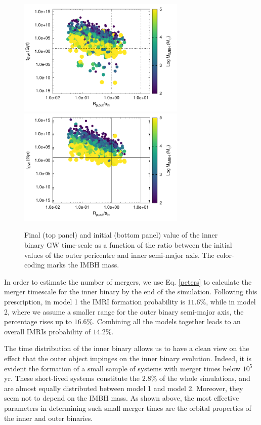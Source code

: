 \documentclass[twocolumn]{aastex62}
\begin{document}
\begin{figure}
\centering 
\includegraphics[width=8cm]{set15_res}
\includegraphics[width=8cm]{set15_res_init}
\caption{Final (top panel) and initial (bottom panel) value of the inner binary GW time-scale as a function of the ratio between the initial values of the outer pericentre and inner semi-major axis. The color-coding marks the IMBH mass.}
\label{res1}
\end{figure}

In order to estimate the number of mergers, we use Eq. \ref{peters} to calculate the merger timescale for the inner binary by the end of the simulation. Following this prescription, in model 1 the IMRI formation probability is $11.6\%$, while in model 2, where we assume a smaller range for the outer binary semi-major axis, the percentage rises up to $16.6\%$. Combining all the models together leads to an overall IMRIs probability of $14.2\%$.

The time distribution of the inner binary allows us to have a clean view on the effect that the outer object impinges on the inner binary evolution. Indeed, it is evident the formation of a small sample of systems with merger times below $10^5$ yr. These short-lived systems constitute the $2.8\%$ of the whole simulations, and are almost equally distributed between model 1 and model 2. Moreover, they seem not to depend on the IMBH mass. As shown above, the most effective parameters in determining such small merger times are the orbital properties of the inner and outer binaries.
\end{document}
